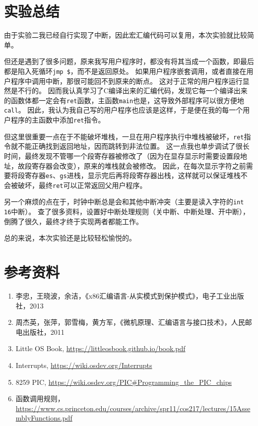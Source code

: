 \documentclass[logo,reportComp]{thesis}
\begin{document}
\section{实验总结}

由于实验二我已经自行实现了中断，因此宏汇编代码可以复用，本次实验就比较简单。

但还是遇到了很多问题，原来我写用户程序时，都没有将其当成一个函数，即最后都是陷入死循环\verb'jmp $'，而不是返回原处。
如果用户程序嵌套调用，或者直接在用户程序中调用中断，那很可能回不到原来的断点。
这对于正常的用户程序运行显然是不行的。
因而我认真学习了C编译出来的汇编代码，发现它每一个编译出来的函数体都一定会有\verb'ret'函数，主函数\verb'main'也是，这导致外部程序可以很方便地\verb'call'。
因此，我认为我自己写的用户程序也应该是这样，于是便在我的每一个用户程序的主函数中添加\verb'ret'指令。

但这里很重要一点在于不能破坏堆栈，一旦在用户程序执行中堆栈被破坏，\verb'ret'指令就不能正确找到返回地址，因而跳转到非法位置。
这一点我也单步调试了很长时间，最终发现不管哪一个段寄存器被修改了（因为在显存显示时需要设置段地址，故段寄存器会改变），原来的堆栈就会被修改。
因此，在每次显示字符之前需要将段寄存器\verb'es'、\verb'gs'进栈，显示完后再将段寄存器出栈，这样就可以保证堆栈不会被破坏，最终\verb'ret'可以正常返回父用户程序。

另一个麻烦的点在于，时钟中断总是会和其他中断冲突（主要是读入字符的\verb'int 16'中断）。
查了很多资料，设置好中断处理规则（关中断、中断处理、开中断），倒腾了很久，最终才终于实现两者都能工作。

总的来说，本次实验还是比较轻松愉悦的。

\section{参考资料}
\begin{enumerate}
	\item 李忠，王晓波，余洁，《x86汇编语言-从实模式到保护模式》，电子工业出版社，2013
	\item 周杰英，张萍，郭雪梅，黄方军，《微机原理、汇编语言与接口技术》，人民邮电出版社，2011
	\item Little OS Book, \url{https://littleosbook.github.io/book.pdf}
	\item Interrupts, \url{https://wiki.osdev.org/Interrupts}
	\item 8259 PIC, \url{https://wiki.osdev.org/PIC#Programming_the_PIC_chips}
	\item 函数调用规则，\url{https://www.cs.princeton.edu/courses/archive/spr11/cos217/lectures/15AssemblyFunctions.pdf}
\end{enumerate}
\end{document}
